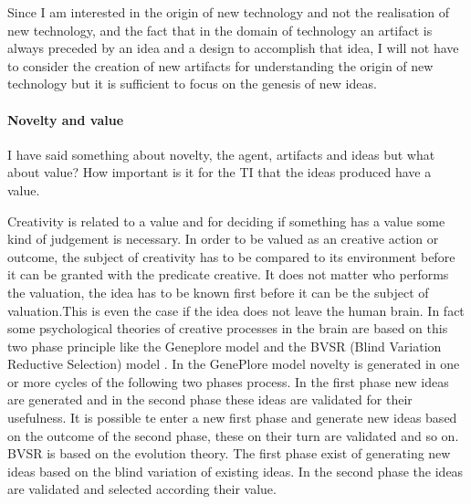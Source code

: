 \documentclass[a4paper]{Thesis}
\begin{document}

Since I am interested in the origin of new technology and not the realisation of new technology, and the fact that in the domain of technology an artifact is always preceded by an idea and a design to accomplish that idea, I will not have to consider the creation of new artifacts for understanding the origin of new technology but it is sufficient to focus on the genesis of new ideas.




\paragraph{Novelty and value}
I have said something about novelty, the agent, artifacts and ideas but what about value? How important is it for the TI that the ideas produced have a value. 

Creativity is related to a value and for deciding if something has a value some kind of judgement is necessary. In order to be valued as an creative action or outcome, the subject of creativity has to be compared to its environment before it can be granted with the predicate creative. It does not matter who performs the valuation, the idea has to be known first before it can be the subject of valuation.This is even the case if the idea does not leave the human brain.
In fact some psychological theories of creative processes in the brain are based on this two phase principle like the Geneplore model \cite{finke1996imagery} and the BVSR (Blind Variation Reductive Selection) model \cite{simonton2003human}.
In the GenePlore model novelty is generated in one or more cycles of the following two phases process. In the first phase new ideas are generated and in the second phase these ideas are validated for their usefulness. It is possible te enter a new first phase and generate new ideas based on the outcome of the second phase, these on their turn are validated and so on. 
BVSR is based on the evolution theory. The first phase exist of generating new ideas based on the blind variation of existing ideas. In the second phase the ideas are validated and selected according their value.
\end{document}
